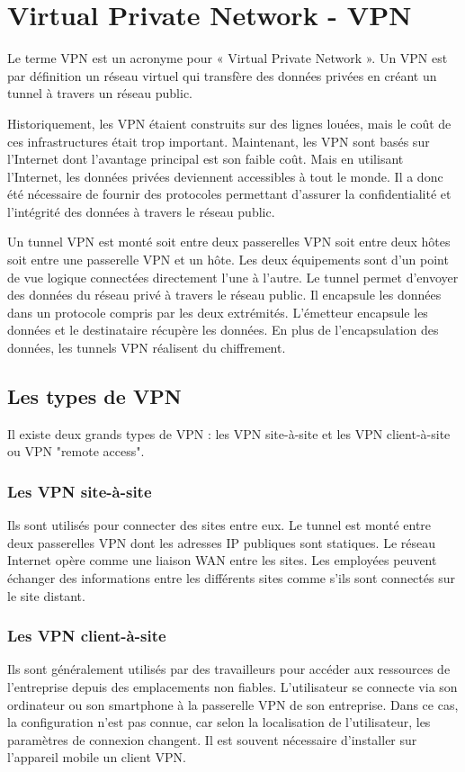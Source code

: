 \section{Virtual Private Network - VPN}
Le terme VPN est un acronyme pour « Virtual Private Network ».
Un VPN est par définition un réseau virtuel qui transfère des données privées en créant un tunnel à travers un réseau public.

Historiquement, les VPN étaient construits sur des lignes louées, mais le coût de ces infrastructures était trop important.
Maintenant, les VPN sont basés sur l'Internet dont l'avantage principal est son faible coût.
Mais en utilisant l'Internet, les données privées deviennent accessibles à tout le monde. 
Il a donc été nécessaire de fournir des protocoles permettant d'assurer la confidentialité et l'intégrité des données à travers le réseau public. 

Un tunnel VPN est monté soit entre deux passerelles VPN soit entre deux hôtes soit entre une passerelle VPN et un hôte. 
Les deux équipements sont d'un point de vue logique connectées directement l'une à l'autre. 
Le tunnel permet d'envoyer des données du réseau privé à travers le réseau public.
Il encapsule les données dans un protocole compris par les deux extrémités. 
L'émetteur encapsule les données et le destinataire récupère les données. 
En plus de l'encapsulation des données, les tunnels VPN réalisent du chiffrement. 

\subsection{Les types de VPN}
Il existe deux grands types de VPN : les VPN site-à-site et les VPN client-à-site ou VPN "remote access".

\subsubsection{Les VPN site-à-site} 
Ils sont utilisés pour connecter des sites entre eux. 
Le tunnel est monté entre deux passerelles VPN dont les adresses IP publiques sont statiques.
Le réseau Internet opère comme une liaison WAN entre les sites. 
Les employées peuvent échanger des informations entre les différents sites comme s'ils sont connectés sur le site distant. 

\subsubsection{Les VPN client-à-site} 
Ils sont généralement utilisés par des travailleurs pour accéder aux ressources de l'entreprise depuis des emplacements non fiables.  
L'utilisateur se connecte via son ordinateur ou son smartphone à la passerelle VPN de son entreprise.  
Dans ce cas, la configuration n'est pas connue, car selon la localisation de l'utilisateur, les paramètres de connexion changent.  
Il est souvent nécessaire d'installer sur l'appareil mobile un client VPN. 

